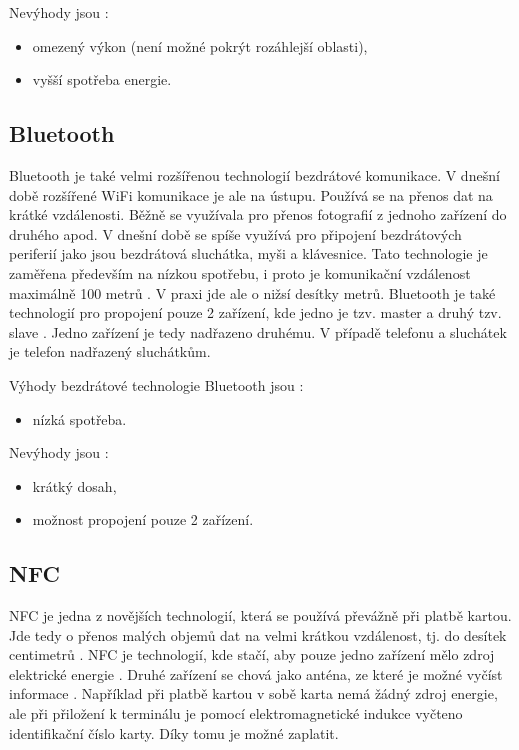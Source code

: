 Nevýhody jsou \cite{Bezdrat_muni}:
\begin{itemize}
  \item omezený výkon (není možné pokrýt rozáhlejší oblasti), %
  \item vyšší spotřeba energie.
\end{itemize}

\subsection{Bluetooth}
Bluetooth je také velmi rozšířenou technologií bezdrátové komunikace. V dnešní době rozšířené WiFi komunikace je ale na ústupu. Používá 
se na přenos dat na krátké vzdálenosti. Běžně se využívala pro přenos fotografií z jednoho zařízení do druhého apod. V dnešní době se
spíše využívá pro připojení bezdrátových periferií jako jsou bezdrátová sluchátka, myši a klávesnice. Tato technologie je zaměřena 
především na nízkou spotřebu, i proto je komunikační vzdálenost maximálně 100 metrů \cite{Bezdrat_muni}. V praxi jde ale o nižsí desítky
metrů. Bluetooth je také technologií pro propojení pouze 2 zařízení, kde jedno je tzv. master a druhý tzv. slave \cite{Bezdrat_muni}. 
Jedno zařízení je tedy nadřazeno druhému. V případě telefonu a sluchátek je telefon nadřazený sluchátkům. 

Výhody bezdrátové technologie Bluetooth jsou \cite{Bezdrat_muni}:
\begin{itemize}
  \item nízká spotřeba.
\end{itemize}

Nevýhody jsou \cite{Bezdrat_muni}:
\begin{itemize}
  \item krátký dosah,
  \item možnost propojení pouze 2 zařízení.
\end{itemize}

\subsection{NFC}
NFC je jedna z novějších technologií, která se používá převážně při platbě kartou. Jde tedy o přenos malých objemů dat na velmi krátkou 
vzdálenost, tj. do desítek centimetrů \cite{Bezdrat_muni}. NFC je technologií, kde stačí, aby pouze jedno zařízení mělo zdroj elektrické 
energie \cite{Bezdrat_muni}. Druhé zařízení se chová jako anténa, ze které je možné vyčíst informace \cite{Bezdrat_muni}. Například při 
platbě kartou v sobě karta nemá žádný zdroj energie, ale při přiložení k terminálu je pomocí elektromagnetické indukce vyčteno identifikační
číslo karty. Díky tomu je možné zaplatit. 


